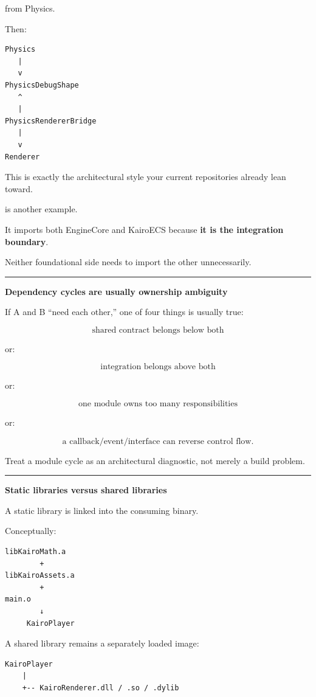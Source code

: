 from Physics.

Then:

\begin{verbatim}
Physics
   |
   v
PhysicsDebugShape
   ^
   |
PhysicsRendererBridge
   |
   v
Renderer
\end{verbatim}

This is exactly the architectural style your current repositories already lean toward.

 is another example.

It imports both EngineCore and KairoECS because \textbf{it is the integration boundary}.

Neither foundational side needs to import the other unnecessarily.

\begin{center}\rule{0.5\linewidth}{0.5pt}\end{center}

\textbf{Dependency cycles are usually ownership ambiguity}

If A and B ``need each other,'' one of four things is usually true:

\[
\text{shared contract belongs below both}
\]

or:

\[
\text{integration belongs above both}
\]

or:

\[
\text{one module owns too many responsibilities}
\]

or:

\[
\text{a callback/event/interface can reverse control flow}.
\]

Treat a module cycle as an architectural diagnostic, not merely a build problem.

\begin{center}\rule{0.5\linewidth}{0.5pt}\end{center}

\textbf{Static libraries versus shared libraries}

A static library is linked into the consuming binary.

Conceptually:

\begin{verbatim}
libKairoMath.a
        +
libKairoAssets.a
        +
main.o
        ↓
     KairoPlayer
\end{verbatim}

A shared library remains a separately loaded image:

\begin{verbatim}
KairoPlayer
    |
    +-- KairoRenderer.dll / .so / .dylib
\end{verbatim}

